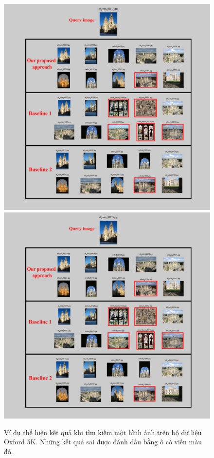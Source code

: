 \begin{figure}[!htbp]
  \begin{center}
    \leavevmode
    \ifpdf
      \includegraphics[scale=0.25]{resOxford5k}
    \else
      \includegraphics[scale=0.25]{resOxford5k}
    \fi
    \caption[Ví dụ thể hiện kết quả khi tìm kiếm một hình ảnh trên bộ dữ liệu Oxford 5K]{Ví dụ thể hiện kết quả khi tìm kiếm một hình ảnh trên bộ dữ liệu Oxford 5K. Những kết quả sai được đánh dấu bằng ô có viền màu đỏ.}
    \label{FigResultsOxf}
  \end{center}
\end{figure}

